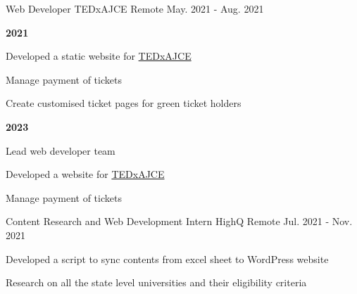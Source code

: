 
\begin{cventries}
  \cventry
    {Web Developer} %
    {TEDxAJCE} %
    {Remote}
    {May. 2021 - Aug. 2021} %
    {
      \begin{cvitems} %
        \item \textbf{2021}
        \item Developed a static website for \hyperlink{https://www.tedxajce.in/tedx2021}{TEDxAJCE}
        \item Manage payment of tickets
        \item Create customised ticket pages for green ticket holders
        \vspace{2mm}
        \item \textbf{2023}
        \item Lead web developer team
        \item Developed a website for \hyperlink{https://www.tedxajce.in/tedx2023}{TEDxAJCE}
        \item Manage payment of tickets
      \end{cvitems}
    }

  \cventry
    {Content Research and Web Development Intern} %
    {HighQ} %
    {Remote} %
    {Jul. 2021 - Nov. 2021} %
    {
      \begin{cvitems} %
        \item Developed a script to sync contents from excel sheet to WordPress website
        \item Research on all the state level universities and their eligibility criteria
      \end{cvitems}
    }


\end{cventries}
